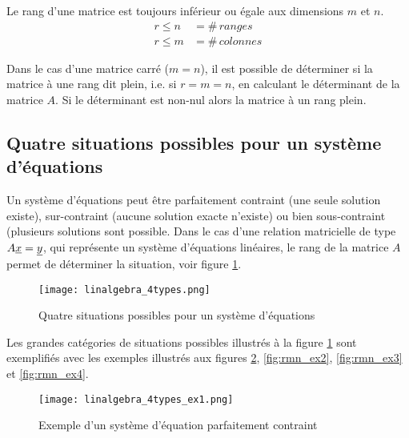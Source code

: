 Le rang d'une matrice est toujours inférieur ou égale aux dimensions $m$ et $n$.
\begin{align}
r \leq n &= \#\, ranges \\
r \leq m &= \#\, colonnes
\end{align}

Dans le cas d'une matrice carré ($m=n$), il est possible de déterminer si la matrice à une rang dit plein, i.e. si $r=m=n$, en calculant le déterminant de la matrice $A$. Si le déterminant est non-nul alors la matrice à un rang plein.  


\newpage
\subsection{Quatre situations possibles pour un système d'équations}
\label{sec:rangpleinvstrop}

Un système d'équations peut être parfaitement contraint (une seule solution existe), sur-contraint (aucune solution exacte n'existe) ou bien sous-contraint (plusieurs solutions sont possible. Dans le cas d'une relation matricielle de type $A \underline{x} = \underline{y} $, qui représente un système d’équations linéaires, le rang de la matrice $A$ permet de déterminer la situation, voir figure \ref{fig:rmn}.

\begin{figure}[htp]
	\centering
		\texttt{[image: linalgebra\_4types.png]}
	\caption{Quatre situations possibles pour un système d'équations}
	\label{fig:rmn}
\end{figure}

Les grandes catégories de situations possibles illustrés à la figure \ref{fig:rmn} sont exemplifiés avec les exemples illustrés aux figures \ref{fig:rmn_ex1}, \ref{fig:rmn_ex2}, \ref{fig:rmn_ex3} et \ref{fig:rmn_ex4}.

\newpage
\begin{example}
\begin{figure}[H]
	\centering
		\texttt{[image: linalgebra\_4types\_ex1.png]}
	\caption{Exemple d'un système d'équation parfaitement contraint}
	\label{fig:rmn_ex1}
\end{figure}
\end{example}

